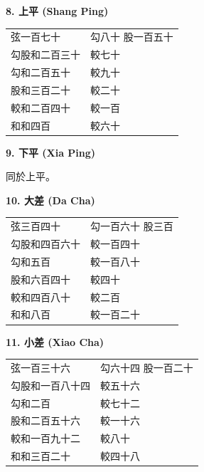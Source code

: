 \documentclass[11pt,a4paper]{article}
\begin{document}
\vspace{0.3cm}

\textbf{8. 上平 (Shang Ping)}

\begin{center}
\begin{tabular}{ll}
弦一百七十 & 勾八十 \quad 股一百五十 \\
勾股和二百三十 & 較七十 \\
勾和二百五十 & 較九十 \\
股和三百二十 & 較二十 \\
較和二百四十 & 較一百 \\
和和四百 & 較六十 \\
\end{tabular}
\end{center}

\vspace{0.3cm}

\textbf{9. 下平 (Xia Ping)}

同於上平。

\vspace{0.3cm}

\textbf{10. 大差 (Da Cha)}

\begin{center}
\begin{tabular}{ll}
弦三百四十 & 勾一百六十 \quad 股三百 \\
勾股和四百六十 & 較一百四十 \\
勾和五百 & 較一百八十 \\
股和六百四十 & 較四十 \\
較和四百八十 & 較二百 \\
和和八百 & 較一百二十 \\
\end{tabular}
\end{center}

\vspace{0.3cm}

\textbf{11. 小差 (Xiao Cha)}

\begin{center}
\begin{tabular}{ll}
弦一百三十六 & 勾六十四 \quad 股一百二十 \\
勾股和一百八十四 & 較五十六 \\
勾和二百 & 較七十二 \\
股和二百五十六 & 較一十六 \\
較和一百九十二 & 較八十 \\
和和三百二十 & 較四十八 \\
\end{tabular}
\end{center}
\end{document}
